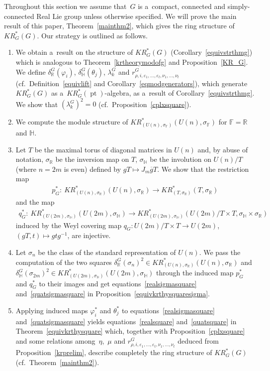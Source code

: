 \documentclass[pdftex]{sigma}
\numberwithin{equation}{section}
\DeclareMathOperator{\pt}{pt}
\begin{document}
Throughout this section we assume that~$G$ is a~compact, connected and simply-connected Real Lie group unless otherwise
specif\/ied.
We will prove the main result of this paper, Theorem~\ref{mainthm2}, which gives the ring structure of $KR_G^*(G)$.
Our strategy is outlined as follows.
\begin{enumerate}\itemsep=0pt
\item
We obtain a~result on the structure of $KR^*_G(G)$ (Corollary~\ref{equivstrthmg}) which is analogous to
Theorem~\ref{krtheorymodofg} and Proposition~\ref{KR_G}.
We def\/ine $\delta_\mathbb{R}^G(\varphi_i)$, $\delta_\mathbb{H}^G(\theta_j)$, $\lambda_k^G$ and $r^G_{\rho, i,
\varepsilon_1, \dots, \varepsilon_t, \nu_1, \dots, \nu_t}$ (cf.\ Def\/inition~\ref{equivlift} and
Corollary~\ref{eqmodgenerators}), which generate $KR_G^*(G)$ as a~$KR_G^*(\pt)$-algebra, as a~result of
Corollary~\ref{equivstrthmg}.
We show that $(\lambda_k^G)^2=0$ (cf.\ Proposition~\ref{cplxsquare}).
\item
We compute the module structure of $KR^*_{(U(n),
\sigma_\mathbb{F})}(U(n),
\sigma_\mathbb{F})$ for $\mathbb{F}=\mathbb{R}$ and $\mathbb{H}$.
\item
Let $T$ be the maximal torus of diagonal matrices in $U(n)$ and, by abuse of notation, $\sigma_\mathbb{R}$ be the inversion map on $T$, $\sigma_\mathbb{H}$ be the involution on $U(n)/T$ (where $n=2m$ is even) def\/ined by $gT\mapsto J_m\overline{g}T$.
We show that the restriction map
\begin{gather*}
p^*_G: \  KR^*_{(U(n),
\sigma_\mathbb{R})}(U(n),
\sigma_\mathbb{R})\to KR^*_{(T,
\sigma_\mathbb{R})}(T,
\sigma_\mathbb{R})
\end{gather*}
and the map
\begin{gather*}
q^*_G: \ KR^*_{(U(2m),
\sigma_\mathbb{H})}(U(2m),
\sigma_\mathbb{H})\to KR^*_{(U(2m),
\sigma_\mathbb{H})}(U(2m)/T\times T,
\sigma_\mathbb{H}
\times
\sigma_\mathbb{R})
\end{gather*}
induced by the Weyl covering map $q_G: U(2m)/T\times T\to U(2m)$, $(gT, t)\mapsto gtg^{-1}$, are injective.
\item
Let $\sigma_n$ be the class of the standard representation of $U(n)$.
We pass the computation of the two squares $\delta_\mathbb{R}^G(\sigma_n)^2\in KR^*_{(U(n), \sigma_\mathbb{R})}(U(n),
\sigma_\mathbb{R})$ and $\delta_\mathbb{H}^G(\sigma_{2m})^2\in KR^*_{(U(2m),
\sigma_\mathbb{H})}(U(2m),
\sigma_\mathbb{H})$ through the induced map $p^*_G$ and $q_G^*$ to their images and get equations~\eqref{realsigmasquare}
and~\eqref{quatsigmasquare} in Proposition~\ref{equivkrthysquaresigma}.
\item
Applying induced maps $\varphi_i^*$ and $\theta_j^*$ to equations~\eqref{realsigmasquare} and~\eqref{quatsigmasquare}
yields equations~\eqref{realsquare} and~\eqref{quatsquare} in Theorem~\ref{equivkrthysquare} which, together with
Proposition~\ref{cplxsquare} and some relations among~$\eta$,~$\mu$ and $r^G_{\rho, i, \varepsilon_1, \dots,
\varepsilon_t, \nu_1, \dots, \nu_t}$ deduced from Proposition~\ref{krprelim}, describe completely the ring structure of
$KR_G^*(G)$ (cf.\ Theorem~\ref{mainthm2}).
\end{enumerate}
\end{document}

